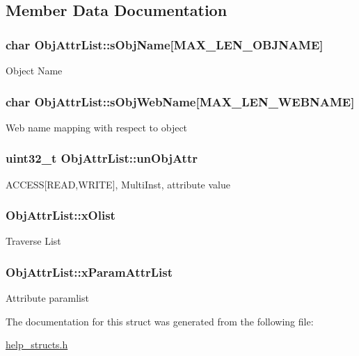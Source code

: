 \subsection{Member Data Documentation}
\hypertarget{structObjAttrList_af9bfa58adec27663f9c06da24304fd49}{
\subsubsection[{s\-Obj\-Name}]{\setlength{\rightskip}{0pt plus 5cm}char Obj\-Attr\-List\-::s\-Obj\-Name\mbox{[}{\bf M\-A\-X\-\_\-\-L\-E\-N\-\_\-\-O\-B\-J\-N\-A\-M\-E}\mbox{]}}}\label{structObjAttrList_af9bfa58adec27663f9c06da24304fd49}
Object Name \hypertarget{structObjAttrList_af1cd26ab3f2b8c069dd248f1afff6ba9}{
\subsubsection[{s\-Obj\-Web\-Name}]{\setlength{\rightskip}{0pt plus 5cm}char Obj\-Attr\-List\-::s\-Obj\-Web\-Name\mbox{[}{\bf M\-A\-X\-\_\-\-L\-E\-N\-\_\-\-W\-E\-B\-N\-A\-M\-E}\mbox{]}}}\label{structObjAttrList_af1cd26ab3f2b8c069dd248f1afff6ba9}
Web name mapping with respect to object \hypertarget{structObjAttrList_a2cbeec81b9de69d1f22715be64840a56}{
\subsubsection[{un\-Obj\-Attr}]{\setlength{\rightskip}{0pt plus 5cm}uint32\-\_\-t Obj\-Attr\-List\-::un\-Obj\-Attr}}\label{structObjAttrList_a2cbeec81b9de69d1f22715be64840a56}
A\-C\-C\-E\-S\-S\mbox{[}R\-E\-A\-D,W\-R\-I\-T\-E\mbox{]}, Multi\-Inst, attribute value \hypertarget{structObjAttrList_ae251d2a8abb6aefd017e82d986a65e8b}{
\subsubsection[{x\-Olist}]{ Obj\-Attr\-List\-::x\-Olist}}\label{structObjAttrList_ae251d2a8abb6aefd017e82d986a65e8b}
Traverse List \hypertarget{structObjAttrList_a5178ea2319b79b81dfe12b57625e1996}{
\subsubsection[{x\-Param\-Attr\-List}]{ Obj\-Attr\-List\-::x\-Param\-Attr\-List}}\label{structObjAttrList_a5178ea2319b79b81dfe12b57625e1996}
Attribute paramlist 

The documentation for this struct was generated from the following file\-:\begin{DoxyCompactItemize}
\item 
\hyperlink{help__structs_8h}{help\-\_\-structs.\-h}\end{DoxyCompactItemize}
